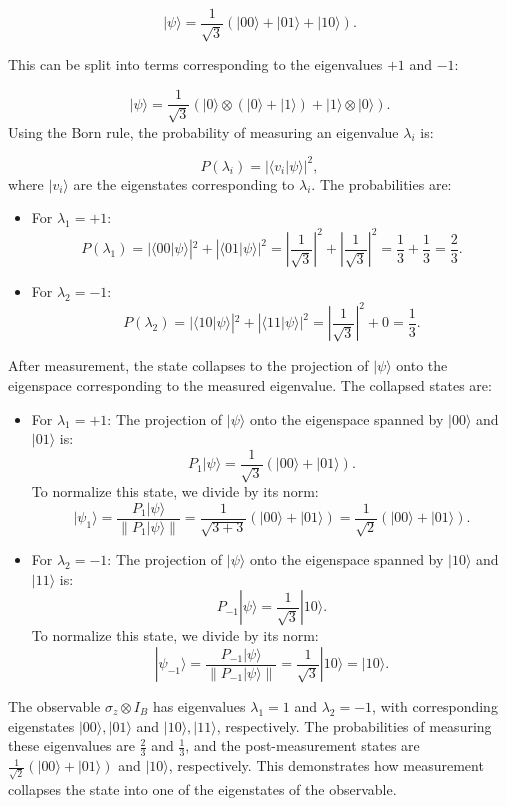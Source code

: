 \documentclass{article}
\begin{document}
\begin{enumerate}
    \[
    |\psi\rangle = \frac{1}{\sqrt{3}} (|00\rangle + |01\rangle + |10\rangle).
    \]

    This can be split into terms corresponding to the eigenvalues \( +1 \) and \( -1 \):

    \[
    |\psi\rangle = \frac{1}{\sqrt{3}} \left( |0\rangle \otimes (|0\rangle + |1\rangle) + |1\rangle \otimes |0\rangle \right).
    \]
Using the Born rule, the probability of measuring an eigenvalue \( \lambda_i \) is:

\[
P(\lambda_i) = |\langle v_i | \psi \rangle|^2,
\]
where \( |v_i\rangle \) are the eigenstates corresponding to \( \lambda_i \). The probabilities are:

\begin{itemize}
  \item For \( \lambda_1 = +1 \):
  \[
  P(\lambda_1) = |\langle 00 | \psi \rangle|^2 + |\langle 01 | \psi \rangle|^2 = \left|\frac{1}{\sqrt{3}}\right|^2 + \left|\frac{1}{\sqrt{3}}\right|^2 = \frac{1}{3} + \frac{1}{3} = \frac{2}{3}.
  \]
  \item For \( \lambda_2 = -1 \):
  \[
  P(\lambda_2) = |\langle 10 | \psi \rangle|^2 + |\langle 11 | \psi \rangle|^2 = \left|\frac{1}{\sqrt{3}}\right|^2 + 0 = \frac{1}{3}.
  \]
\end{itemize}

After measurement, the state collapses to the projection of \( |\psi\rangle \) onto the eigenspace corresponding to the measured eigenvalue. The collapsed states are:

\begin{itemize}
  \item For \( \lambda_1 = +1 \): The projection of \( |\psi\rangle \) onto the eigenspace spanned by \( |00\rangle \) and \( |01\rangle \) is:
  \[
  P_1 |\psi\rangle = \frac{1}{\sqrt{3}} (|00\rangle + |01\rangle).
  \]
  To normalize this state, we divide by its norm:
  \[
  |\psi_1\rangle = \frac{P_1 |\psi\rangle}{\|P_1 |\psi\rangle\|} = \frac{1}{\sqrt{3 + 3}} (|00\rangle + |01\rangle) = \frac{1}{\sqrt{2}} (|00\rangle + |01\rangle).
  \]

  \item For \( \lambda_2 = -1 \): The projection of \( |\psi\rangle \) onto the eigenspace spanned by \( |10\rangle \) and \( |11\rangle \) is:
  \[
  P_{-1} |\psi\rangle = \frac{1}{\sqrt{3}} |10\rangle.
  \]
  To normalize this state, we divide by its norm:
  \[
  |\psi_{-1}\rangle = \frac{P_{-1} |\psi\rangle}{\|P_{-1} |\psi\rangle\|} = \frac{1}{\sqrt{3}} |10\rangle = |10\rangle.
  \]
\end{itemize}

The observable \( \sigma_z \otimes I_B \) has eigenvalues \( \lambda_1 = 1 \) and \( \lambda_2 = -1 \), with corresponding eigenstates \( |00\rangle, |01\rangle \) and \( |10\rangle, |11\rangle \), respectively. The probabilities of measuring these eigenvalues are \( \frac{2}{3} \) and \( \frac{1}{3} \), and the post-measurement states are \( \frac{1}{\sqrt{2}} (|00\rangle + |01\rangle) \) and \( |10\rangle \), respectively. This demonstrates how measurement collapses the state into one of the eigenstates of the observable.

\end{enumerate}
\end{document}

